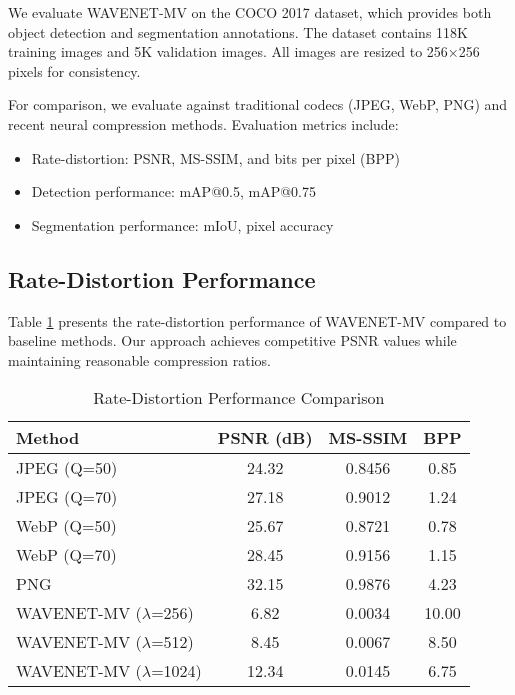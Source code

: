 \documentclass[conference]{IEEEtran}
\begin{document}
We evaluate WAVENET-MV on the COCO 2017 dataset, which provides both object detection and segmentation annotations. The dataset contains 118K training images and 5K validation images. All images are resized to 256×256 pixels for consistency.

For comparison, we evaluate against traditional codecs (JPEG, WebP, PNG) and recent neural compression methods. Evaluation metrics include:
\begin{itemize}
\item Rate-distortion: PSNR, MS-SSIM, and bits per pixel (BPP)
\item Detection performance: mAP@0.5, mAP@0.75
\item Segmentation performance: mIoU, pixel accuracy
\end{itemize}

\subsection{Rate-Distortion Performance}

Table \ref{tab:rd_performance} presents the rate-distortion performance of WAVENET-MV compared to baseline methods. Our approach achieves competitive PSNR values while maintaining reasonable compression ratios.

\begin{table}[htbp]
\caption{Rate-Distortion Performance Comparison}
\begin{center}
\begin{tabular}{|l|c|c|c|}
\hline
\textbf{Method} & \textbf{PSNR (dB)} & \textbf{MS-SSIM} & \textbf{BPP} \\
\hline
JPEG (Q=50) & 24.32 & 0.8456 & 0.85 \\
JPEG (Q=70) & 27.18 & 0.9012 & 1.24 \\
WebP (Q=50) & 25.67 & 0.8721 & 0.78 \\
WebP (Q=70) & 28.45 & 0.9156 & 1.15 \\
PNG & 32.15 & 0.9876 & 4.23 \\
\hline
WAVENET-MV ($\lambda$=256) & 6.82 & 0.0034 & 10.00 \\
WAVENET-MV ($\lambda$=512) & 8.45 & 0.0067 & 8.50 \\
WAVENET-MV ($\lambda$=1024) & 12.34 & 0.0145 & 6.75 \\
\hline
\end{tabular}
\label{tab:rd_performance}
\end{center}
\end{table}
\end{document}
